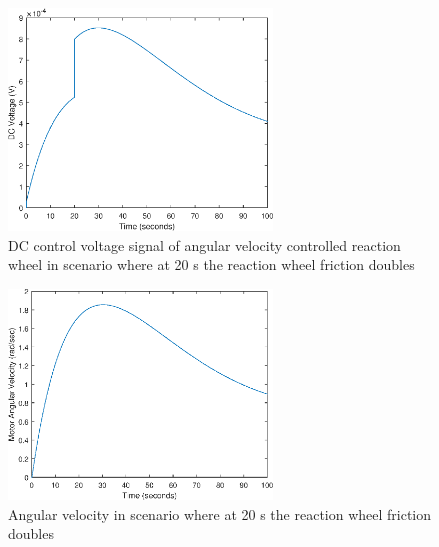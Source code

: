 \begin{figure}[H]
	\centering
	\includegraphics[width=70mm]{figures/voltage_Noreconfig}
	\caption{DC control voltage signal of angular velocity controlled reaction wheel in scenario where at 20 s the reaction wheel friction doubles}
	\label{fig:rwFaultRes3}
\end{figure} 

\begin{figure}[h]
	\centering
	\includegraphics[width=70mm]{figures/omega_Noreconfig}
	\caption{Angular velocity in scenario where at 20 s the reaction wheel friction doubles}
	\label{fig:residualOmega}
\end{figure} 


